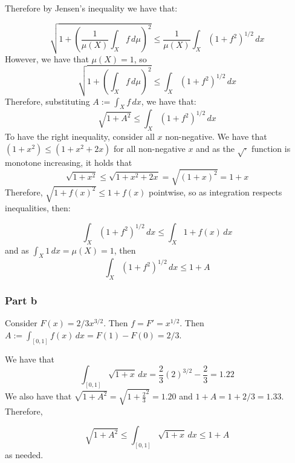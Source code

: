 \documentclass{article}
\theoremstyle{definition}
\numberwithin{theorem}{section}
\numberwithin{equation}{section}
\begin{document}
Therefore by Jensen's inequality we have that:

\begin{equation}
	\sqrt{1 + \left(\frac{1}{\mu(X)} \int_X f \, d\mu\right)^2} \leq \frac{1}{\mu(X)} \int_X \left(1 + f^2\right)^{1/2} \, dx
\end{equation}
However, we have that $\mu(X) = 1$, so 
\begin{equation}
	\sqrt{1 + \left( \int_X f \, d\mu\right)^2} \leq \int_X \left(1 + f^2\right)^{1/2} \, dx
\end{equation}
Therefore, substituting $A := \int_X f \, dx$, we have that:
\begin{equation}
	\sqrt{1 + A^2} \leq \int_X \left(1 + f^2\right)^{1/2} \, dx
\end{equation}
To have the right inequality, consider all $x$ non-negative. We have that $(1 + x^2) \leq (1 + x^2 + 2x)$ for all non-negative $x$ and as the $\sqrt{ \cdot }$ function is monotone increasing, it holds that
\begin{equation}
	\sqrt{1 + x^2} \leq \sqrt{1 + x^2 + 2x} = \sqrt{(1 + x)^2} = 1 + x
\end{equation}
Therefore, $\sqrt{1 + f(x)^2} \leq 1 + f(x)$ pointwise, so as integration respects inequalities, then:

\begin{equation}
\int_X \left(1 + f^2\right)^{1/2} \, dx \leq \int_X 1 + f(x) \, dx
\end{equation}
and as $\int_X 1 \, dx = \mu(X) = 1$, then 
\begin{equation}
	\int_X \left(1 + f^2\right)^{1/2} \, dx \leq 1 + A
\end{equation}
\subsubsection*{Part b}
Consider $F(x) = 2/3 x^{3/2}$. Then $f = F' = x^{1/2}$. Then $A := \int_{[0,1]} f(x) \, dx =  F(1) - F(0) = 2/3$. 

We have that
\begin{equation}
	\int_{[0,1]} \sqrt{1 + x} \, dx = \frac{2}{3} (2)^{3/2} - \frac{2}{3} = 1.22
\end{equation}
We also have that $\sqrt{1 + A^2} = \sqrt{1 + \frac{2}{3}^2} = 1.20$ and $1 + A = 1 + 2/3 = 1.33$. Therefore, 

\begin{equation}
	\sqrt{1 + A^2} \leq \int_{[0,1]} \sqrt{1 + x} \, dx \leq 1 + A
\end{equation}
as needed.
\end{document}
